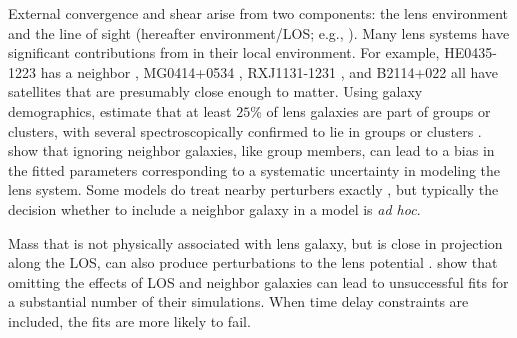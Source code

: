 
External convergence and shear arise from two components: the lens environment and the line of sight (hereafter environment/LOS; e.g., \citealt{Jaroszynski14,Seljak94,Bar-Kana96,Keeton97}). Many lens systems have significant contributions from in their local environment. For example, HE0435-1223 has a neighbor \citep{Kochanek06}, MG0414+0534 \citep{Tonry99}, RXJ1131-1231 \citep{Sluse03}, and B2114+022 \citep{King99} all have satellites that are presumably close enough to matter. Using galaxy demographics, \citet{Keeton00} estimate that at least $25\%$ of lens galaxies are part of groups or clusters, with several spectroscopically confirmed to lie in groups or clusters \citep[][and references therein]{Momcheva06}. \citet{Keeton04} show that ignoring neighbor galaxies, like group members, can lead to a bias in the fitted  parameters corresponding to a systematic uncertainty in modeling the lens system. Some models do treat nearby perturbers exactly \citep[e.g.][]{Fadely12}, but typically the decision whether to include a neighbor galaxy in a model is \textit{ad hoc}.

Mass that is not physically associated with lens galaxy, but is close in projection along the LOS, can also produce perturbations to the lens potential \citep[e.g.,][]{Bar-Kana96,Momcheva06, Wong11}. 
\citet{Jaroszynski14} show that omitting the effects of LOS and neighbor galaxies can lead to unsuccessful fits for a substantial number of their simulations. When time delay constraints are included, the fits are more likely to fail.